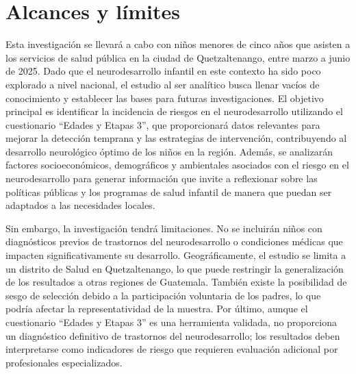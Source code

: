 \documentclass[11pt,letterpaper]{report}
\newcommand{\tiempito}{marzo a junio de 2025}
\begin{document}
	\chapter{Alcances y límites}
Esta investigación se llevará a cabo con niños menores de cinco años que
asisten a los servicios de salud pública en la ciudad de Quetzaltenango, entre
\tiempito. Dado que el neurodesarrollo infantil en este contexto ha sido poco
explorado a nivel nacional, el estudio al ser analítico busca llenar vacíos de
conocimiento y establecer las bases para futuras investigaciones. El objetivo
principal es identificar la incidencia de riesgos en el neurodesarrollo
utilizando el cuestionario “Edades y Etapas 3”, que proporcionará datos
relevantes para mejorar la detección temprana y las estrategias de
intervención, contribuyendo al desarrollo neurológico óptimo de los niños en la
región. Además, se analizarán factores socioeconómicos, demográficos y
ambientales asociados con el riesgo en el neurodesarrollo para generar
información que invite a reflexionar sobre las políticas públicas y los
programas de salud infantil de manera que puedan ser adaptados a las
necesidades locales.

Sin embargo, la investigación tendrá limitaciones. No se incluirán niños con
diagnósticos previos de trastornos del neurodesarrollo o condiciones médicas
que impacten significativamente su desarrollo. Geográficamente, el estudio se
limita a un distrito de Salud en Quetzaltenango, lo que puede restringir la
generalización de los resultados a otras regiones de Guatemala. También existe
la posibilidad de sesgo de selección debido a la participación voluntaria de
los padres, lo que podría afectar la representatividad de la muestra. Por
último, aunque el cuestionario “Edades y Etapas 3” es una herramienta validada,
no proporciona un diagnóstico definitivo de trastornos del neurodesarrollo; los
resultados deben interpretarse como indicadores de riesgo que requieren
evaluación adicional por profesionales especializados.

\printbibliography
\end{document}
